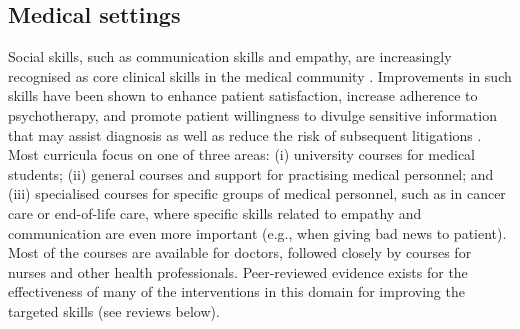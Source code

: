 \documentclass[prodmode,acmtochi]{acmsmall}
\newcommand{\GeraldineFIX}[1]{}
\newcommand{\rephrase}[1]{\textrm{\textrm{\textcolor{gray}{#1}}}}
\begin{document}
\subsection{Medical settings}
\GeraldineFIX{ G: need to think about this TITLE bit more - is this meant to be medical as in just doctors, or medical in its broader sense? Eg doctors, nurses, allied health, therapists, etc ... in which case 'clinical settings' might be a more encompassing term.... }
\GeraldineFIX{ G: then in writing up. you can say you focus first on the medical profession ... and do the doctor-patient training .... and then look at other healthcare/clinical professions more generally eg including nurses, physios, counsellers/therapists etc???}
\GeraldineFIX{ G: Also think the section structure could be thought about a bit more ... eg is it useful to separate out different SEL foci:... \\
1. being a better dr and managing own HWB (eg mindfulness skills); \\
2. general clinican-patient relationship eg.\\
gathering information from patient (interview/question skills???); giving difficult news;  establishing collaboratively designed care plans, empowering patients to take own responsibility etc ... there is a term for this model fo care but can't remember! (eg as in motivational interviewing)}

Social skills, such as communication skills and empathy, are increasingly recognised as core clinical skills in the medical community \cite{Rider2006,Barth2011,Makoul2007,Kalet2004}. Improvements in such skills have been shown to enhance patient satisfaction, increase adherence to psychotherapy, and promote patient willingness to divulge sensitive information that may assist diagnosis as well as reduce the risk of subsequent litigations \cite{Stewart1995,Brown2008}. %
Most curricula focus on one of  three areas: (i) university courses for medical students; (ii) general courses and support for practising medical personnel; and (iii) specialised courses for specific groups of medical personnel, such as in cancer care or end-of-life care, where specific skills related to empathy and communication are even more important        (e.g., when giving bad news to patient). Most of the courses are available for doctors, followed closely by courses for nurses and other health professionals. Peer-reviewed evidence exists for the effectiveness of  many of the interventions in this domain for improving the targeted skills
(see reviews below).
\end{document}
